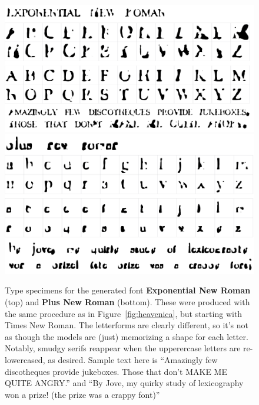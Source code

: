 \documentclass[twocolumn]{article}
\begin{document}
\begin{figure}[tp]
\centering
\includegraphics[width=0.9 \linewidth]{expnewroman} \\[0.5in]
\includegraphics[width=0.9 \linewidth]{plusnewroman} \\
\caption{
  Type specimens for the generated font {\bf Exponential New Roman} (top)
  and {\bf Plus New Roman} (bottom). These were produced with
  the same procedure as in Figure~\ref{fig:heavenica}, but starting
  with Times New Roman. The letterforms are clearly different, so
  it's not as though the models are (just) memorizing a shape for
  each letter. Notably, smudgy serifs reappear when the upperercase letters
  are re-lowercased, as desired.
  Sample text here is ``Amazingly few discotheques provide jukeboxes.
  Those that don't MAKE ME QUITE ANGRY.'' and 
  ``By Jove, my quirky study of lexicography won a prize! (the prize
  was a crappy font)''
} \label{fig:roman}
\end{figure}
\end{document}
